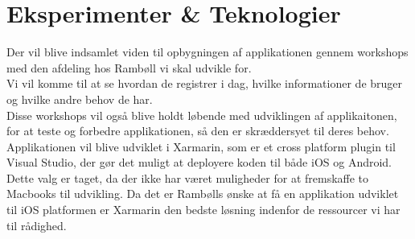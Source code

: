 	\section{Eksperimenter \& Teknologier}
	Der vil blive indsamlet viden til opbygningen af applikationen gennem workshops med den afdeling hos Rambøll vi skal udvikle for.\\
	Vi vil komme til at se hvordan de registrer i dag, hvilke informationer de bruger og hvilke andre behov de har.\\
	Disse workshops vil også blive holdt løbende med udviklingen af applikaitonen, for at teste og forbedre applikationen, så den er skræddersyet til deres behov. \newline
	Applikationen vil blive udviklet i Xarmarin, som er et cross platform plugin til Visual Studio, der gør det muligt at deployere koden til både iOS og Android.\\
	Dette valg er taget, da der ikke har været muligheder for at fremskaffe to Macbooks til udvikling. Da det er Rambølls ønske at få en applikation udviklet til iOS platformen er Xarmarin den bedste løsning indenfor de ressourcer vi har til rådighed. 

